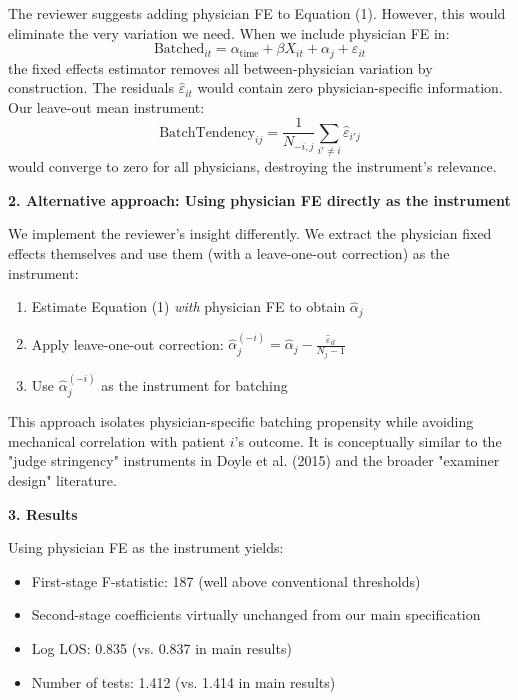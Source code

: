 \documentclass[11pt]{article}
\newcommand{\1}{\hbox{\rm 1\kern-.35em 1}}
\begin{document}
{The reviewer suggests adding physician FE to Equation (1). However, this would eliminate the very variation we need. When we include physician FE in:
\begin{equation}
\text{Batched}_{it} = \alpha_{\text{time}} + \beta X_{it} + \alpha_j + \varepsilon_{it}
\end{equation}
the fixed effects estimator removes all between-physician variation by construction. The residuals $\hat{\varepsilon}_{it}$ would contain zero physician-specific information. Our leave-out mean instrument:
$$\text{BatchTendency}_{ij} = \frac{1}{N_{-i,j}}\sum_{i' \neq i} \hat{\varepsilon}_{i'j}$$
would converge to zero for all physicians, destroying the instrument's relevance.

\bigskip
\noindent\textbf{2. Alternative approach: Using physician FE directly as the instrument}

We implement the reviewer's insight differently. We extract the physician fixed effects themselves and use them (with a leave-one-out correction) as the instrument:

\begin{enumerate}
\item Estimate Equation (1) \textit{with} physician FE to obtain $\hat{\alpha}_j$
\item Apply leave-one-out correction: $\hat{\alpha}_j^{(-i)} = \hat{\alpha}_j - \frac{\hat{\varepsilon}_{it}}{N_j - 1}$
\item Use $\hat{\alpha}_j^{(-i)}$ as the instrument for batching
\end{enumerate}

This approach isolates physician-specific batching propensity while avoiding mechanical correlation with patient $i$'s outcome. It is conceptually similar to the "judge stringency" instruments in Doyle et al. (2015) and the broader "examiner design" literature.

\bigskip
\noindent\textbf{3. Results}

Using physician FE as the instrument yields:
\begin{itemize}
\item First-stage F-statistic: 187 (well above conventional thresholds)
\item Second-stage coefficients virtually unchanged from our main specification
\item Log LOS: 0.835 (vs. 0.837 in main results)
\item Number of tests: 1.412 (vs. 1.414 in main results)
\end{itemize}

}
\end{document}
